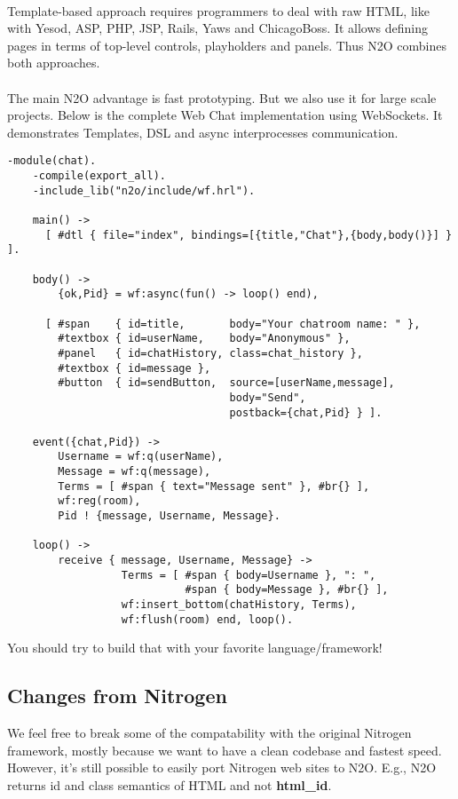 \paragraph{}
Template-based approach requires programmers to deal with raw HTML,
like with Yesod, ASP, PHP, JSP, Rails, Yaws and ChicagoBoss. It allows
defining pages in terms of top-level controls, playholders
and panels. Thus N2O combines both approaches.

\paragraph{}
The main N2O advantage is fast prototyping. But we also use it for large
scale projects. Below is the complete Web Chat implementation using
WebSockets. It demonstrates Templates, DSL and async
interprocesses communication.

\newpage
\begin{lstlisting}[caption=chat.erl]
    -module(chat).
    -compile(export_all).
    -include_lib("n2o/include/wf.hrl").

    main() -> 
      [ #dtl { file="index", bindings=[{title,"Chat"},{body,body()}] } ].

    body() ->
        {ok,Pid} = wf:async(fun() -> loop() end),

      [ #span    { id=title,       body="Your chatroom name: " }, 
        #textbox { id=userName,    body="Anonymous" },
        #panel   { id=chatHistory, class=chat_history },
        #textbox { id=message },
        #button  { id=sendButton,  source=[userName,message],
                                   body="Send", 
                                   postback={chat,Pid} } ].

    event({chat,Pid}) ->
        Username = wf:q(userName),
        Message = wf:q(message),
        Terms = [ #span { text="Message sent" }, #br{} ],
        wf:reg(room),
        Pid ! {message, Username, Message}.

    loop() ->
        receive { message, Username, Message} ->
                  Terms = [ #span { body=Username }, ": ",
                            #span { body=Message }, #br{} ],
                  wf:insert_bottom(chatHistory, Terms),
                  wf:flush(room) end, loop().
\end{lstlisting}

You should try to build that with your favorite language/framework!

\subsection*{Changes from Nitrogen}
We feel free to break some of the compatability with the original
Nitrogen framework, mostly because we want to have a clean codebase
and fastest speed. However, it's still possible to easily port
Nitrogen web sites to N2O. E.g., N2O returns id and class semantics
of HTML and not {\bf html\_id}.

